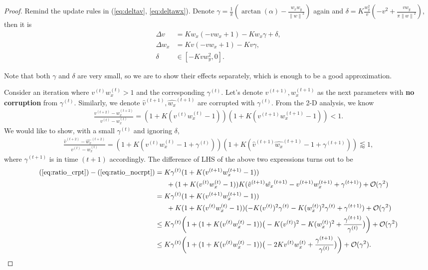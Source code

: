 \documentclass{article}
\theoremstyle{plain}
\theoremstyle{remark}
\newcommand{\norm}[1]{\left\lVert#1\right\rVert}
\newcommand{\T}[1]{^{(#1)}}
\def\t{^{(t)}}
\def\tt{^{(t+1)}}
\def\O{\mathcal{O}}
\begin{document}
\begin{proof}
Remind the update rules in (\ref{eq:deltav}, \ref{eq:deltawx}). Denote $\gamma = \frac{1}{\pi}(\arctan(\alpha)-\frac{w_x w_y}{\norm{w}^2})$ again and $\delta = K\frac{w_y^2}{v}(-v^2+\frac{v w_y}{\pi \norm{w}^2})$, then it is
\begin{align}
    \Delta v &= Kw_x(-vw_x+1)-Kw_x\gamma + \delta, \label{eq:deltavcorr}\\
    \Delta w_x &= Kv(-vw_x+1)-Kv\gamma, \\
    \delta &\in [-Kvw_y^2, 0].
\end{align}

Note that both $\gamma$ and $\delta$ are very small, so we are to show their effects separately, which is enough to be a good approximation.

Consider an iteration where $v\t w_x\t>1$ and the corresponding $\gamma\t$. Let's denote $v\tt,w_x\tt$ as the next parameters with \textbf{no corruption} from $\gamma\t$. Similarly, we denote $\hat{v}\tt, \hat{w_x}\tt$ are corrupted with $\gamma\t$. From the 2-D analysis, we know
\begin{align}
    \frac{v\T{t+2}-w_x\T{t+2}}{v\t-w_x\t} = (1+K(v\t w_x\t-1))(1+K(v\tt w_x\tt-1))<1. \label{eq:ratio_nocrpt}
\end{align}
We would like to show, with a small $\gamma\t$ and ignoring $\delta$,
\begin{align}
    \frac{\hat{v}\T{t+2}-\hat{w_x}\T{t+2}}{v\t-w_x\t} = (1+K(v\t w_x\t-1+\gamma\t))(1+K(\hat{v}\tt \hat{w_x}\tt-1+\gamma\tt))\lessapprox 1, \label{eq:ratio_crpt}
\end{align}
where $\gamma\tt$ is in time $(t+1)$ accordingly.
The difference of LHS of the above two expressions turns out to be
\begin{align}
    (\ref{eq:ratio_crpt})-(\ref{eq:ratio_nocrpt})
    &=
    K\gamma\t (1+K(v\tt w_x\tt-1)) \nonumber \\
    &~~~~~ + (1+K(v\t w_x\t-1))K(\hat{v}\tt \hat{w_x}\tt - v\tt w_x\tt+\gamma\tt) + \O(\gamma^2) \nonumber \\
    &=
    K\gamma\t (1+K(v\tt w_x\tt-1)) \nonumber \\
    &~~~~~ + K(1+K(v\t w_x\t-1))(-K(v\t)^2 \gamma\t-K(w_x\t)^2 \gamma\t+\gamma\tt) + \O(\gamma^2) \nonumber \\
    &\le K\gamma\t\bigg(
    1+(1+K(v\t w_x\t-1))\big(
    -K(v\t)^2-K(w_x\t)^2+\frac{\gamma\tt}{\gamma\t}
    \big)
    \bigg)+\O(\gamma^2) \nonumber \\
    &\le K\gamma\t\bigg(
    1+(1+K(v\t w_x\t-1))\big(
    -2K v\t w_x\t +\frac{\gamma\tt}{\gamma\t}
    \big)
    \bigg)+\O(\gamma^2). \label{eq:diff_ratios}
\end{align}


\end{proof}
\end{document}
